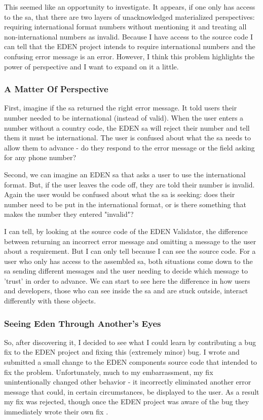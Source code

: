 \documentclass[a4paper,man,natbib,floatsintext]{apa6}
\begin{document}
   
   This seemed like an opportunity to investigate. It appears, if one only has access to the \gls{sa}, that there are two layers of unacknowledged materialized perspectives: requiring international format numbers without mentioning it and treating all non-international numbers as invalid. Because I have access to the source code I can tell that the \gls{EDEN} project intends to require international numbers and the confusing error message is an error. However, I think this problem highlights the power of perspective and I want to expand on it a little.


   \subsubsection{A Matter Of Perspective}
   First, imagine if the \gls{sa} returned the right error message. It told users their number needed to be international (instead of valid). When the user enters a number without a country code, the \gls{EDEN} \gls{sa} will reject their number and tell them it must be international. The user is confused about what the \gls{sa} needs to allow them to advance - do they respond to the error message or the field asking for any phone number?

   Second, we can imagine an \gls{EDEN} \gls{sa} that asks a user to use the international format. But, if the user leaves the code off, they are told their number is invalid. Again the user would be confused about what the \gls{sa} is seeking: does their number need to be put in the international format, or is there something that makes the number they entered "invalid"?

   I can tell, by looking at the source code of the \gls{EDEN} Validator, the difference between returning an incorrect error message and omitting a message to the user about a requirement. But I can only tell because I can see the source code. For a user who only has access to the assembled \gls{sa}, both situations come down to the \gls{sa} sending different messages and the user needing to decide which message to 'trust' in order to advance. We can start to see here the difference in how users and developers, those who can see inside the \gls{sa} and are stuck outside, interact differently with these objects. 

   \subsubsection{Seeing Eden Through Another's Eyes}
   So, after discovering it, I decided to see what I could learn by contributing a bug fix to the \gls{EDEN} project and fixing this (extremely minor) bug. I wrote and submitted a small change to the \gls{EDEN} components source code that intended to fix the problem. Unfortunately, much to my embarrassment, my fix unintentionally changed other behavior - it incorrectly eliminated another error message that could, in certain circumstances, be displayed to the user. As a result my fix was rejected, though once the \gls{EDEN} project was aware of the bug they immediately wrote their own fix \citep{Konig2020-ey}.
\end{document}
